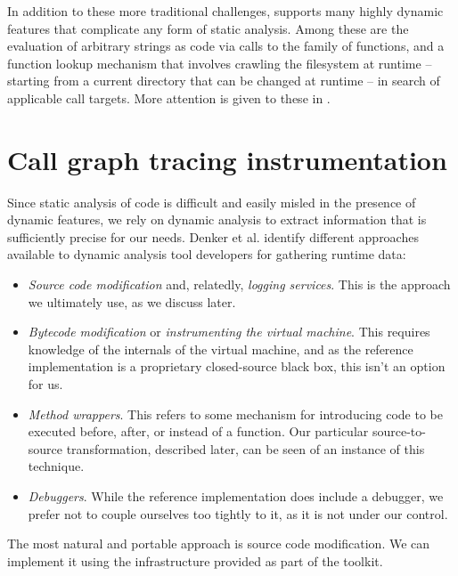 In addition to these more traditional challenges, \matlab supports many highly
dynamic features that complicate any form of static analysis. Among these are
the evaluation of arbitrary strings as code via calls to the  family
of functions, and a function lookup mechanism that involves crawling the
filesystem at runtime -- starting from a current directory that can be changed
at runtime -- in search of applicable call targets. More attention is given to
these in .

\section{Call graph tracing instrumentation}

Since static analysis of \matlab code is difficult and easily misled in the
presence of dynamic features, we rely on dynamic analysis to extract
information that is sufficiently precise for our needs. Denker et al.
\cite{AbstractionsForDynamicAnalysis} identify different approaches available
to dynamic analysis tool developers for gathering runtime data:

\begin{itemize}
\item \emph{Source code modification} and, relatedly, \emph{logging services}.
This is the approach we ultimately use, as we discuss later.
\item \emph{Bytecode modification} or \emph{instrumenting the virtual machine}.
This requires knowledge of the internals of the \matlab virtual machine, and as
the reference \matlab implementation is a proprietary closed-source black box,
this isn't an option for us.
\item \emph{Method wrappers}. This refers to some mechanism for introducing
code to be executed before, after, or instead of a function. Our particular
source-to-source transformation, described later, can be seen of an instance of
this technique.
\item \emph{Debuggers}. While the reference \matlab implementation does include
a debugger, we prefer not to couple ourselves too tightly to it, as it is not
under our control.
\end{itemize}

The most natural and portable approach is source code modification. We can
implement it using the infrastructure provided as part of the \mclab toolkit.

